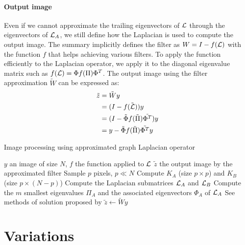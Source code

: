 \paragraph{Output image}
Even if we cannot approximate the trailing eigenvectors of \(\operatorname{\mathcal{L}}\) through the eigenvectors of \(\operatorname{\mathcal{L}}_A\), we still define how the Laplacian is used to compute the output image.
The summary \cite{modern_tour_2013} implicitly defines the filter as \(W = I - f(\operatorname{\mathcal{L}})\) with the function \(f\) that helps achieving various filters.
To apply the function efficiently to the Laplacian operator, we apply it to the diagonal eigenvalue matrix such as \(f(\operatorname{\mathcal{L}}) = \Phi f(\Pi) \Phi^T\).
The output image using the filter approximation \(\tilde{W}\) can be expressed as:
\begin{equation}
 \begin{split}
     \tilde{z} & = \tilde{W}y \\
               & = (I - f(\tilde{\operatorname{\mathcal{L}}})) y \\
               & = (I - \tilde{\Phi} f(\tilde{\Pi}) \tilde{\Phi^T}) y \\
               & = y - \tilde{\Phi} f(\tilde{\Pi}) \tilde{\Phi^T} y
 \end{split}
\end{equation}

\begin{algorithm}[H]
 \caption{Image processing using approximated graph Laplacian operator}
 \begin{algorithmic}
  \REQUIRE \(y\) an image of size \(N\), \(f\) the function applied to \(\operatorname{\mathcal{L}}\)
  \ENSURE \(\tilde{z}\) the output image by the approximated filter
  \STATE {}
  \STATE Sample \(p\) pixels, \(p \ll N\)
  \STATE {}
  \STATE Compute \(K_A\) (size \(p \times p\)) and \(K_B\) (size \(p \times (N-p)\))
  \STATE Compute the Laplacian submatrices \(\operatorname{\mathcal{L}}_A\) and \(\operatorname{\mathcal{L}}_B\)
  \STATE {}
  \STATE Compute the \(m\) smallest eigenvalues \(\Pi_A\) and the associated eigenvectors \(\Phi_A\) of \(\operatorname{\mathcal{L}}_A\)
  \STATE {}
  \STATE See methods of solution proposed by \cite{fowlkes_spectral_2004}
  \STATE \(\tilde{z} \leftarrow \tilde{W} y\)
 \end{algorithmic}
\end{algorithm}

\section{Variations}

